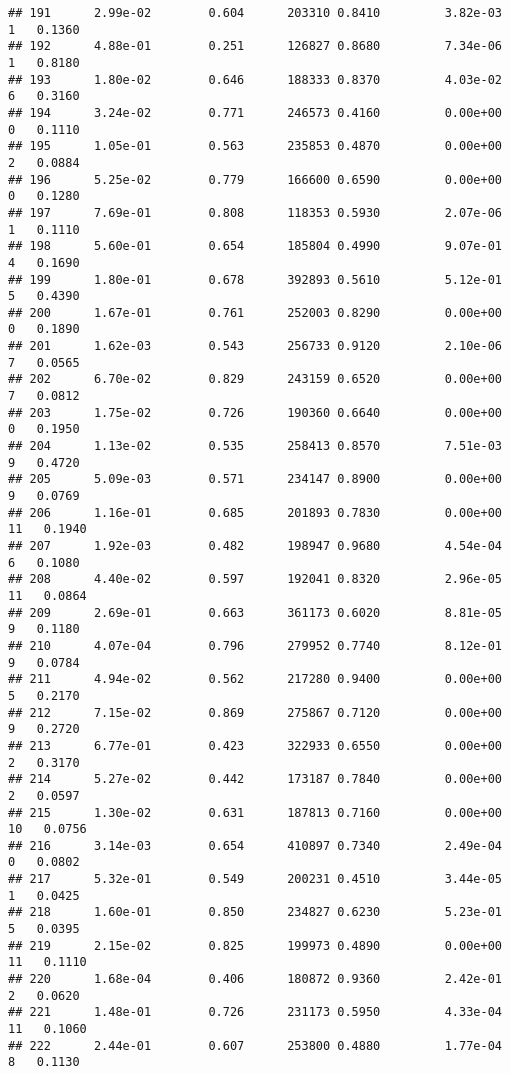 \documentclass[
]{article}
\begin{document}
\begin{verbatim}
## 191      2.99e-02        0.604      203310 0.8410         3.82e-03   1   0.1360
## 192      4.88e-01        0.251      126827 0.8680         7.34e-06   1   0.8180
## 193      1.80e-02        0.646      188333 0.8370         4.03e-02   6   0.3160
## 194      3.24e-02        0.771      246573 0.4160         0.00e+00   0   0.1110
## 195      1.05e-01        0.563      235853 0.4870         0.00e+00   2   0.0884
## 196      5.25e-02        0.779      166600 0.6590         0.00e+00   0   0.1280
## 197      7.69e-01        0.808      118353 0.5930         2.07e-06   1   0.1110
## 198      5.60e-01        0.654      185804 0.4990         9.07e-01   4   0.1690
## 199      1.80e-01        0.678      392893 0.5610         5.12e-01   5   0.4390
## 200      1.67e-01        0.761      252003 0.8290         0.00e+00   0   0.1890
## 201      1.62e-03        0.543      256733 0.9120         2.10e-06   7   0.0565
## 202      6.70e-02        0.829      243159 0.6520         0.00e+00   7   0.0812
## 203      1.75e-02        0.726      190360 0.6640         0.00e+00   0   0.1950
## 204      1.13e-02        0.535      258413 0.8570         7.51e-03   9   0.4720
## 205      5.09e-03        0.571      234147 0.8900         0.00e+00   9   0.0769
## 206      1.16e-01        0.685      201893 0.7830         0.00e+00  11   0.1940
## 207      1.92e-03        0.482      198947 0.9680         4.54e-04   6   0.1080
## 208      4.40e-02        0.597      192041 0.8320         2.96e-05  11   0.0864
## 209      2.69e-01        0.663      361173 0.6020         8.81e-05   9   0.1180
## 210      4.07e-04        0.796      279952 0.7740         8.12e-01   9   0.0784
## 211      4.94e-02        0.562      217280 0.9400         0.00e+00   5   0.2170
## 212      7.15e-02        0.869      275867 0.7120         0.00e+00   9   0.2720
## 213      6.77e-01        0.423      322933 0.6550         0.00e+00   2   0.3170
## 214      5.27e-02        0.442      173187 0.7840         0.00e+00   2   0.0597
## 215      1.30e-02        0.631      187813 0.7160         0.00e+00  10   0.0756
## 216      3.14e-03        0.654      410897 0.7340         2.49e-04   0   0.0802
## 217      5.32e-01        0.549      200231 0.4510         3.44e-05   1   0.0425
## 218      1.60e-01        0.850      234827 0.6230         5.23e-01   5   0.0395
## 219      2.15e-02        0.825      199973 0.4890         0.00e+00  11   0.1110
## 220      1.68e-04        0.406      180872 0.9360         2.42e-01   2   0.0620
## 221      1.48e-01        0.726      231173 0.5950         4.33e-04  11   0.1060
## 222      2.44e-01        0.607      253800 0.4880         1.77e-04   8   0.1130

\end{verbatim}
\end{document}
